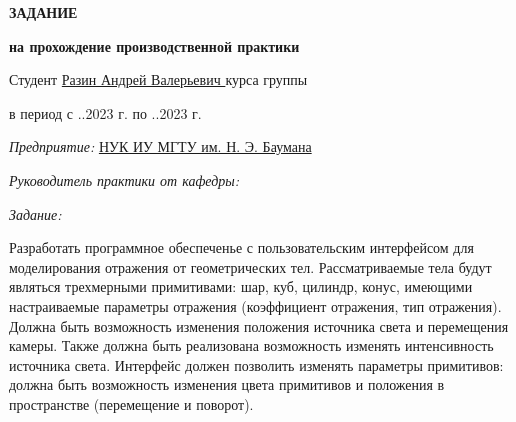 \begin{center}\linespread{1}\selectfont
    \Large{\textbf{ЗАДАНИЕ}}

    \large{\textbf{на прохождение производственной практики}}

    \large{}
\end{center}

\fontsize{14pt}{14pt}\selectfont

\noindent Студент \uline{\hfill Разин Андрей Валерьевич \hfill}  курса группы 

\vspace{0.3cm}

\noindent в период с ..2023 г. по ..2023 г.

\vspace{0.3cm}

\noindent \textit{Предприятие:} \uline{\hfill НУК ИУ МГТУ им. Н. Э. Баумана \hfill}

\vspace{0.3cm}






\noindent \textit{Руководитель практики от кафедры:}

\noindent {}

\vspace{0.3cm}

\noindent \textit{Задание:}

Разработать программное обеспеченье с пользовательским интерфейсом для моделирования отражения от геометрических тел. 
Рассматриваемые тела будут являться трехмерными примитивами: шар, куб, цилиндр, конус, имеющими настраиваемые параметры отражения (коэффициент отражения, тип отражения). 
Должна быть возможность изменения положения источника света и перемещения камеры. 
Также должна быть реализована возможность изменять интенсивность источника света. 
Интерфейс должен позволить изменять параметры примитивов: должна быть возможность изменения цвета примитивов и положения в пространстве (перемещение и поворот).


